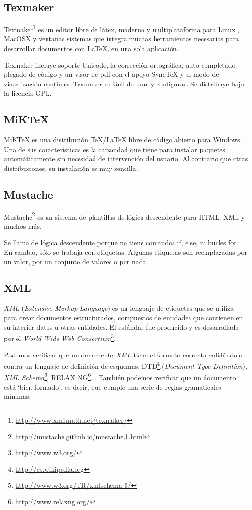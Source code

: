 \subsection{Texmaker}
Texmaker\footnote{\url{http://www.xm1math.net/texmaker/}} es un editor libre de látex, moderno y multiplataforma para Linux , MacOSX y ventanas sistemas que integra muchas herramientas necesarias para desarrollar documentos con \LaTeX{}, en una sola aplicación.

Texmaker incluye soporte Unicode, la corrección ortográfica, auto-completado, plegado de código y un visor de pdf con el apoyo SyncTeX y el modo de visualización continua. Texmaker es fácil de usar y configurar. Se distribuye bajo la licencia GPL.

\subsection{MiK\TeX{}}
MiK\TeX{} es una distribución \TeX{}/\LaTeX{} libre de código abierto para Windows.
Una de sus características es la capacidad que tiene para instalar paquetes automáticamente sin necesidad de intervención del usuario. Al contrario que otras distribuciones, su instalación es muy sencilla.

\subsection{Mustache}
Mustache\footnote{\url{http://mustache.github.io/mustache.1.html}} es un sistema de plantillas de lógica descendente para HTML, XML y muchos más.

Se llama de lógica descendente porque no tiene comandos if, else, ni bucles for. En cambio, sólo se trabaja con etiquetas.
Algunas etiquetas son reemplazadas por un valor, por un conjunto de valores o por nada.
\subsection{XML}
\emph{XML} (\emph{Extensive Markup Language}) es un lenguaje de etiquetas que se utiliza para crear documentos estructurados, compuestos de entidades que contienen en su interior datos u otras entidades.
El estándar fue producido y es desarrollado por el \emph{World Wide Web Consortium}\footnote{\url{http://www.w3.org/}}.

Podemos verificar que un documento \emph{XML} tiene el formato correcto validándolo contra un lenguaje de definición de esquemas: DTD\footnote{\url{http://es.wikipedia.org}},(\emph{Document Type Definition}), \emph{XML Schema}\footnote{\url{http://www.w3.org/TR/xmlschema-0/}}, RELAX NG\footnote{\url{http://www.relaxng.org/}}...
También podemos verificar que un documento está `bien formado', es decir, que cumple una serie de reglas gramaticales mínimas.

